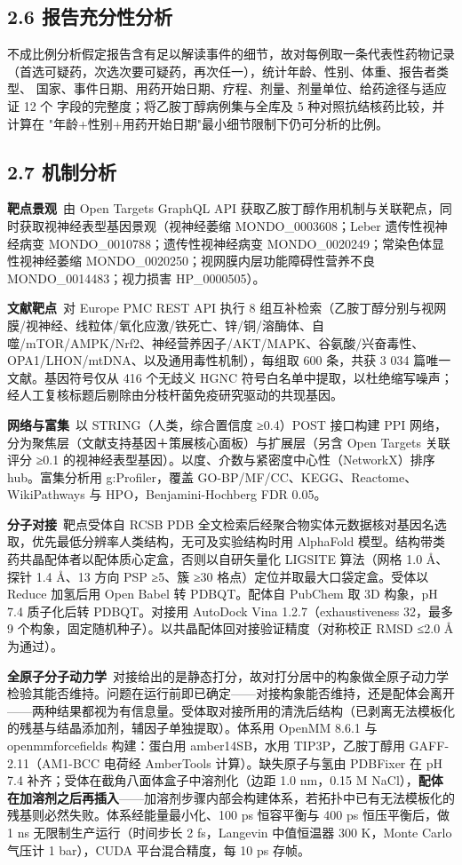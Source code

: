 \documentclass[UTF8,fontset=windows,11pt]{ctexart}
\begin{document}
\subsection{2.6 报告充分性分析}

不成比例分析假定报告含有足以解读事件的细节，故对每例取一条代表性药物记录 （首选可疑药，次选次要可疑药，再次任一），统计年龄、性别、体重、报告者类型、 国家、事件日期、用药开始日期、疗程、剂量、剂量单位、给药途径与适应证 12 个 字段的完整度；将乙胺丁醇病例集与全库及 5 种对照抗结核药比较，并计算在 "年龄+性别+用药开始日期"最小细节限制下仍可分析的比例。

\subsection{2.7 机制分析}

\textbf{靶点景观}\ 由 Open Targets GraphQL API 获取乙胺丁醇作用机制与关联靶点，同时获取视神经表型基因景观（视神经萎缩 MONDO\_0003608；Leber 遗传性视神经病变 MONDO\_0010788；遗传性视神经病变 MONDO\_0020249；常染色体显性视神经萎缩 MONDO\_0020250；视网膜内层功能障碍性营养不良 MONDO\_0014483；视力损害 HP\_0000505）。

\textbf{文献靶点}\ 对 Europe PMC REST API 执行 8 组互补检索（乙胺丁醇分别与视网膜/视神经、线粒体/氧化应激/铁死亡、锌/铜/溶酶体、自噬/mTOR/AMPK/Nrf2、神经营养因子/AKT/MAPK、谷氨酸/兴奋毒性、OPA1/LHON/mtDNA、以及通用毒性机制），每组取 600 条，共获 3 034 篇唯一文献。基因符号仅从 416 个无歧义 HGNC 符号白名单中提取，以杜绝缩写噪声；经人工复核标题后剔除由分枝杆菌免疫研究驱动的共现基因。

\textbf{网络与富集}\ 以 STRING（人类，综合置信度 ≥0.4）POST 接口构建 PPI 网络，分为聚焦层（文献支持基因＋策展核心面板）与扩展层（另含 Open Targets 关联评分 ≥0.1 的视神经表型基因）。以度、介数与紧密度中心性（NetworkX）排序 hub。富集分析用 g:Profiler，覆盖 GO-BP/MF/CC、KEGG、Reactome、WikiPathways 与 HPO，Benjamini-Hochberg FDR 0.05。

\textbf{分子对接}\ 靶点受体自 RCSB PDB 全文检索后经聚合物实体元数据核对基因名选取，优先最低分辨率人类结构，无可及实验结构时用 AlphaFold 模型。结构带类药共晶配体者以配体质心定盒，否则以自研矢量化 LIGSITE 算法（网格 1.0 Å、探针 1.4 Å、13 方向 PSP ≥5、簇 ≥30 格点）定位并取最大口袋定盒。受体以 Reduce 加氢后用 Open Babel 转 PDBQT。配体自 PubChem 取 3D 构象，pH 7.4 质子化后转 PDBQT。对接用 AutoDock Vina 1.2.7（exhaustiveness 32，最多 9 个构象，固定随机种子）。以共晶配体回对接验证精度（对称校正 RMSD ≤2.0 Å 为通过）。

\textbf{全原子分子动力学}\ 对接给出的是静态打分，故对打分居中的构象做全原子动力学检验其能否维持。问题在运行前即已确定——对接构象能否维持，还是配体会离开——两种结果都视为有信息量。受体取对接所用的清洗后结构（已剥离无法模板化的残基与结晶添加剂，辅因子单独提取）。体系用 OpenMM 8.6.1 与 openmmforcefields 构建：蛋白用 amber14SB，水用 TIP3P，乙胺丁醇用 GAFF-2.11（AM1-BCC 电荷经 AmberTools 计算）。缺失原子与氢由 PDBFixer 在 pH 7.4 补齐；受体在截角八面体盒子中溶剂化（边距 1.0 nm，0.15 M NaCl），\textbf{配体在加溶剂之后再插入}——加溶剂步骤内部会构建体系，若拓扑中已有无法模板化的残基则必然失败。体系经能量最小化、100 ps 恒容平衡与 400 ps 恒压平衡后，做 1 ns 无限制生产运行（时间步长 2 fs，Langevin 中值恒温器 300 K，Monte Carlo 气压计 1 bar），CUDA 平台混合精度，每 10 ps 存帧。
\end{document}
